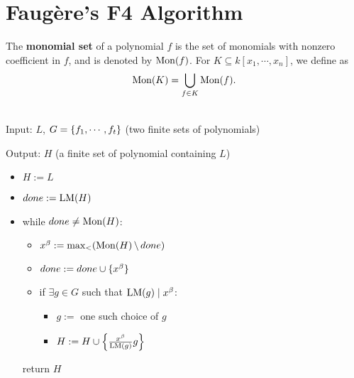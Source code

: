 \chapter{Faug\`ere's F4 Algorithm}

\begin{definition}
    \label{def:MonomialSet}
    \leanok
    The \textbf{monomial set} of a polynomial \(f\) is the set of monomials with
    nonzero coefficient in \(f\), and is denoted by \(\mathrm{Mon}(f)\). For \(K
    \subseteq k[x_1, \cdots, x_n]\), we define as
    \[\mathrm{Mon}(K) = \bigcup_{f \in K} \mathrm{Mon}(f).\]
\end{definition}

\begin{definition}
    \label{def:SymbolicPreprocessing}
    \leanok
    ~\\
    
    Input: \(L\), \(G = \{ f_1, \cdots, f_t \}\)
    (two finite sets of polynomials)

    Output: \(H\) (a finite set of polynomial containing \(L\))

    \begin{itemize}
        \item[] \(H := L\)
        \item[] \(done := \mathrm{LM}(H)\)
        \item[] while \(done \ne \mathrm{Mon}(H)\):
            \begin{itemize}
                \item[] \(x^\beta := \max_{<} (\mathrm{Mon}(H) \,\backslash\, done)\)
                \item[] \(done := done \cup \{ x^\beta \}\)
                \item[] if \(\exists g \in G\) such that \(\mathrm{LM}(g) \mid x^\beta\):
                    \begin{itemize}
                        \item[] \(g :=\) one such choice of \(g\)
                        \item[] \(H := H \cup \left\{ \frac{x^\beta}{\mathrm{LM}(g)} g \right\}\)
                    \end{itemize}
            \end{itemize}
        return \(H\)
    \end{itemize}
\end{definition}

